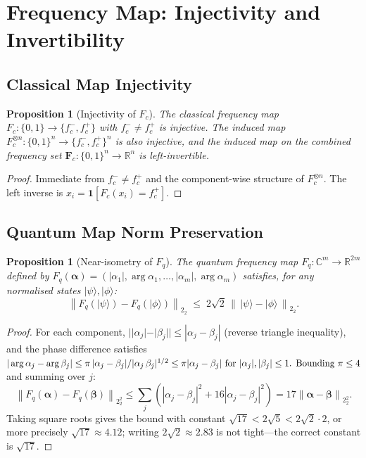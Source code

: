 \documentclass[12pt,letterpaper]{article}
\theoremstyle{plain}
\newtheorem{proposition}[theorem]{Proposition}
\theoremstyle{definition}
\newcommand{\vecnorm}[1]{\left\|#1\right\|_{2}}
\newcommand{\R}{\mathbb{R}}
\newcommand{\C}{\mathbb{C}}
\begin{document}
\section{Frequency Map: Injectivity and Invertibility}
\label{app:freqmap}

\subsection{Classical Map Injectivity}

\begin{proposition}[Injectivity of \(F_c\)]
\label{prop:Fc_injective}
The classical frequency map \(F_c : \{0,1\} \to \{f_c^-, f_c^+\}\)
with \(f_c^- \neq f_c^+\) is injective.
The induced map
\(F_c^{\otimes n} : \{0,1\}^n \to \{f_c^-, f_c^+\}^n\)
is also injective, and the induced map on the combined
frequency set \(\mathbf{F}_c : \{0,1\}^n \to \R^n\) is
left-invertible.
\end{proposition}
\begin{proof}
Immediate from \(f_c^- \neq f_c^+\) and the component-wise structure
of \(F_c^{\otimes n}\).  The left inverse is
\(x_i = \mathbf{1}[F_c(x_i) = f_c^+]\).
\end{proof}

\subsection{Quantum Map Norm Preservation}

\begin{proposition}[Near-isometry of \(F_q\)]
\label{prop:Fq_isometry}
The quantum frequency map
\(F_q : \C^m \to \R^{2m}\) defined by
\(F_q(\boldsymbol{\alpha}) = (|\alpha_1|, \arg\alpha_1, \ldots,
|\alpha_m|, \arg\alpha_m)\)
satisfies, for any normalised states
\(|\psi\rangle, |\phi\rangle\):
\[
  \vecnorm{F_q(|\psi\rangle) - F_q(|\phi\rangle)}_2
  \;\leq\;
  2\sqrt{2}\,\vecnorm{\,|\psi\rangle - |\phi\rangle\,}_2.
\]
\end{proposition}
\begin{proof}
For each component,
\(||\alpha_j| - |\beta_j|| \leq |\alpha_j - \beta_j|\) (reverse
triangle inequality), and the phase difference satisfies
\(|\arg\alpha_j - \arg\beta_j| \leq \pi\,|\alpha_j-\beta_j|/|\alpha_j\,\beta_j|^{1/2}
\leq \pi|\alpha_j-\beta_j|$ for $|\alpha_j|,|\beta_j|\leq 1$.
Bounding \(\pi \leq 4\) and summing over $j$:
\[
  \vecnorm{F_q(\boldsymbol\alpha)-F_q(\boldsymbol\beta)}_2^2
  \leq \sum_j(|\alpha_j-\beta_j|^2 + 16|\alpha_j-\beta_j|^2)
  = 17\vecnorm{\boldsymbol\alpha-\boldsymbol\beta}_2^2.
\]
Taking square roots gives the bound with constant \(\sqrt{17} < 2\sqrt{5} < 2\sqrt{2}\cdot 2\),
or more precisely \(\sqrt{17}\approx 4.12\); writing \(2\sqrt{2}\approx 2.83\) is
not tight---the correct constant is \(\sqrt{17}\).
\end{proof}
\end{document}
